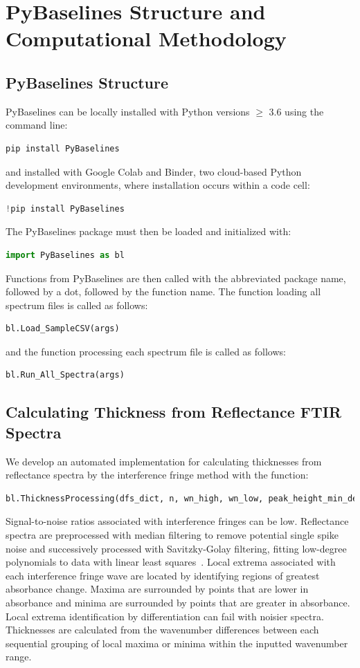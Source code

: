 \documentclass[draft]{agujournal2019}
\begin{document}
\section{PyBaselines Structure and Computational Methodology} %
\subsection{PyBaselines Structure}
PyBaselines can be locally installed with Python versions $\ge$ 3.6 using the command line: 
\begin{lstlisting}[language=Python]
pip install PyBaselines 
\end{lstlisting}
and installed with Google Colab and Binder, two cloud-based Python development environments, where installation occurs within a code cell: 
\begin{lstlisting}[language=Python]
!pip install PyBaselines 
\end{lstlisting}
The PyBaselines package must then be loaded and initialized with: 
\begin{lstlisting}[language=Python]
import PyBaselines as bl
\end{lstlisting}
Functions from PyBaselines are then called with the abbreviated package name, followed by a dot, followed by the function name. The function loading all spectrum files is called as follows: 
\begin{lstlisting}[language=Python]
bl.Load_SampleCSV(args)
\end{lstlisting}
and the function processing each spectrum file is called as follows: 
\begin{lstlisting}[language=Python]
bl.Run_All_Spectra(args)
\end{lstlisting}

\subsection{Calculating Thickness from Reflectance FTIR Spectra}
We develop an automated implementation for calculating thicknesses from reflectance spectra by the interference fringe method with the function: 
\begin{lstlisting}[language=Python]
bl.ThicknessProcessing(dfs_dict, n, wn_high, wn_low, peak_height_min_delta, peak_search_width)
\end{lstlisting}
Signal-to-noise ratios associated with interference fringes can be low. Reflectance spectra are preprocessed with median filtering to remove potential single spike noise and successively processed with Savitzky-Golay filtering, fitting low-degree polynomials to data with linear least squares~\cite{SavitzkyandGolay1964}. Local extrema associated with each interference fringe wave are located by identifying regions of greatest absorbance change. Maxima are surrounded by points that are lower in absorbance and minima are surrounded by points that are greater in absorbance. Local extrema identification by differentiation can fail with noisier spectra. Thicknesses are calculated from the wavenumber differences between each sequential grouping of local maxima or minima within the inputted wavenumber range. 
\end{document}
